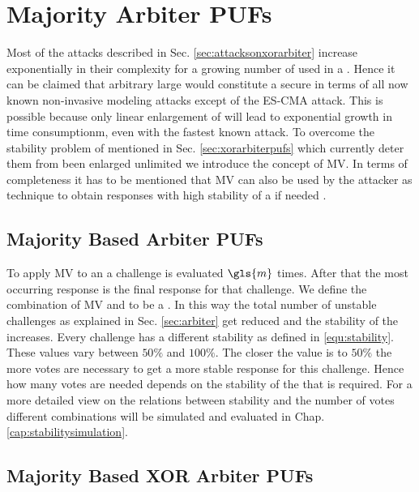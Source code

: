 \chapter{Majority Arbiter PUFs}
\label{cap:majorityarbiter}

Most of the attacks described in Sec. \ref{sec:attacksonxorarbiter} increase exponentially in their complexity for a growing number of used \apufs in a \xpuf. 
Hence it can be claimed that arbitrary large \xpufs would constitute a secure \puf in terms of all now known non-invasive modeling attacks except of the \ac{ES-CMA} attack.
This is possible because only linear enlargement of \xpufs will lead to exponential growth in time consumptionm, even with the fastest known attack.
To overcome the stability problem of \xpufs mentioned in Sec. \ref{sec:xorarbiterpufs} which currently deter them from been enlarged unlimited we introduce the concept of \ac{MV}. %
In terms of completeness it has to be mentioned that \ac{MV} can also be used by the attacker as technique to obtain responses with high stability of a \puf if needed \cite{Ganji2016PACPUFs, Ozturk2008TowardsDevices}.

\section{Majority Based Arbiter PUFs}
\label{sec:majorityarbiter}

To apply \ac{MV} to an \apuf a challenge is evaluated $\gls{m}$ times.
After that the most occurring response is the final response for that challenge.
We define the combination of \ac{MV} and \apuf to be a \mpuf.
In this way the total number of unstable challenges as explained in Sec. \ref{sec:arbiter} get reduced and the stability of the \apuf increases.
Every challenge has a different stability as defined in \ref{equ:stability}.%
These values vary between $50 \%$ and $100 \%$.
The closer the value is to $50 \%$ the more votes are necessary to get a more stable response for this challenge.
Hence how many votes are needed depends on the stability of the \apuf that is required. 
For a more detailed view on the relations between stability and the number of votes different combinations will be simulated and evaluated in Chap. \ref{cap:stabilitysimulation}.


\section{Majority Based XOR Arbiter PUFs}
\label{sec:majorityxorarbiter}

